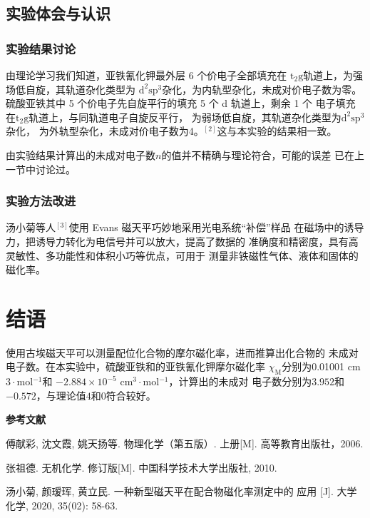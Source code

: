 \documentclass[12pt]{ctexart}
\numberwithin{equation}{section}
\begin{document}
\subsection{实验体会与认识}
\subsubsection{实验结果讨论}

由理论学习我们知道，亚铁氰化钾最外层 6 个价电子全部填充在
$\mathrm{t_2 g}$轨道上，为强场低自旋，其轨道杂化类型为
$\mathrm{d^2 sp^3}$杂化，为内轨型杂化，未成对价电子数为零。
硫酸亚铁其中 5 个价电子先自旋平行的填充 5 个 d 轨道上，剩余 1 个
电子填充在$\mathrm{t_2 g}$轨道上，与同轨道电子自旋反平行，
为弱场低自旋，其轨道杂化类型为$\mathrm{d^2 sp^3}$杂化，
为外轨型杂化，未成对价电子数为4。$^{[2]}$这与本实验的结果相一致。

由实验结果计算出的未成对电子数$n$的值并不精确与理论符合，可能的误差
已在上一节中讨论过。

\subsubsection{实验方法改进}

汤小菊等人$^{[3]}$使用 Evans 磁天平巧妙地采用光电系统“补偿”样品
在磁场中的诱导力，把诱导力转化为电信号并可以放大，提高了数据的
准确度和精密度，具有高灵敏性、多功能性和体积小巧等优点，可用于
测量非铁磁性气体、液体和固体的磁化率。

\section{结语}

使用古埃磁天平可以测量配位化合物的摩尔磁化率，进而推算出化合物的
未成对电子数。在本实验中，硫酸亚铁和的亚铁氰化钾摩尔磁化率
$\chi_\text{M}$分别为0.01001 cm$3\cdot$mol$^{-1}$和
$-2.884\times 10^{-5}$ cm$^3\cdot$mol$^{-1}$，计算出的未成对
电子数分别为$3.952$和$-0.572$，与理论值$4$和$0$符合较好。

\begin{center}
    \Large\bfseries{参考文献}
\end{center}
\noindent
[1] 傅献彩, 沈文霞, 姚天扬等. 物理化学（第五版）. 上册[M].
高等教育出版社，2006.

\noindent
[2] 张祖德. 无机化学. 修订版[M]. 中国科学技术大学出版社, 2010.

\noindent
[3] 汤小菊, 颜瑷珲, 黄立民. 一种新型磁天平在配合物磁化率测定中的
应用 [J]. 大学化学, 2020, 35(02): 58-63.
\end{document}

